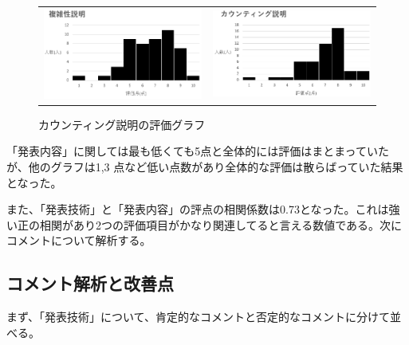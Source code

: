 \begin{figure}[h]
 \begin{tabular}{cc}
  \begin{minipage}[h]{0.45\hsize}
  \centering
 \includegraphics[width=0.7\linewidth]{./figure/hukuzatusei.jpg}
\caption{複雑性説明の評価グラフ}
\label{hukuzatusei}
 \end{minipage} &

\begin{minipage}[h]{0.45\hsize}
  \centering
 \includegraphics[width=0.7\linewidth]{./figure/counting.jpg}
 \caption{カウンティング説明の評価グラフ}
\label{counting}
\end{minipage} 
\end{tabular}
\end{figure}

「発表内容」に関しては最も低くても5点と全体的には評価はまとまっていたが、他のグラフは1,3
点など低い点数があり全体的な評価は散らばっていた結果となった。

また、「発表技術」と「発表内容」の評点の相関係数は0.73となった。これは強い正の相関があり2つの評価項目がかなり関連してると言える数値である。次にコメントについて解析する。


\subsection{コメント解析と改善点}
まず、「発表技術」について、肯定的なコメントと否定的なコメントに分けて並べる。

